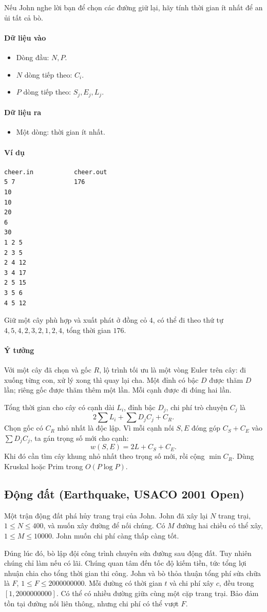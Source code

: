 \documentclass[11pt]{article}
\newcommand{\problem}[1]{\subsection{#1}}
\newcommand{\iosec}[1]{\paragraph{#1}}
\newcommand{\bigO}[1]{\ensuremath{O(#1)}}
\begin{document}
Nếu John nghe lời bạn để chọn các đường giữ lại, hãy tính thời gian ít nhất để an ủi tất cả bò.

\iosec{Dữ liệu vào}
\begin{itemize}
  \item Dòng đầu: \(N,P\).
  \item \(N\) dòng tiếp theo: \(C_i\).
  \item \(P\) dòng tiếp theo: \(S_j,E_j,L_j\).
\end{itemize}

\iosec{Dữ liệu ra}
\begin{itemize}
  \item Một dòng: thời gian ít nhất.
\end{itemize}

\iosec{Ví dụ}
\begin{verbatim}
cheer.in           cheer.out
5 7                176
10
10
20
6
30
1 2 5
2 3 5
2 4 12
3 4 17
2 5 15
3 5 6
4 5 12
\end{verbatim}

Giữ một cây phù hợp và xuất phát ở đồng cỏ \(4\), có thể đi theo thứ tự \(4,5,4,2,3,2,1,2,4\), tổng thời gian \(176\).

\iosec{Ý tưởng}
Với một cây đã chọn và gốc \(R\), lộ trình tối ưu là một vòng Euler trên cây: đi xuống từng con, xử lý xong thì quay lại cha. Một đỉnh có bậc \(D\) được thăm \(D\) lần; riêng gốc được thăm thêm một lần. Mỗi cạnh được đi đúng hai lần.

Tổng thời gian cho cây có cạnh dài \(L_i\), đỉnh bậc \(D_j\), chi phí trò chuyện \(C_j\) là
\[
  2\sum L_i+\sum D_jC_j+C_R.
\]
Chọn gốc có \(C_R\) nhỏ nhất là độc lập. Vì mỗi cạnh nối \(S,E\) đóng góp \(C_S+C_E\) vào \(\sum D_jC_j\), ta gán trọng số mới cho cạnh:
\[
  w(S,E)=2L+C_S+C_E.
\]
Khi đó cần tìm cây khung nhỏ nhất theo trọng số mới, rồi cộng \(\min C_R\). Dùng Kruskal hoặc Prim trong \(\bigO{P\log P}\).

\problem{Động đất (Earthquake, USACO 2001 Open)}

Một trận động đất phá hủy trang trại của John. John đã xây lại \(N\) trang trại, \(1 \le N \le 400\), và muốn xây đường để nối chúng. Có \(M\) đường hai chiều có thể xây, \(1 \le M \le 10000\). John muốn chi phí càng thấp càng tốt.

Đúng lúc đó, bò lập đội công trình chuyên sửa đường sau động đất. Tuy nhiên chúng chỉ làm nếu có lãi. Chúng quan tâm đến tốc độ kiếm tiền, tức tổng lợi nhuận chia cho tổng thời gian thi công. John và bò thỏa thuận tổng phí sửa chữa là \(F\), \(1 \le F \le 2000000000\). Mỗi đường có thời gian \(t\) và chi phí xây \(c\), đều trong \([1,2000000000]\). Có thể có nhiều đường giữa cùng một cặp trang trại. Bảo đảm tồn tại đường nối liên thông, nhưng chi phí có thể vượt \(F\).
\end{document}

